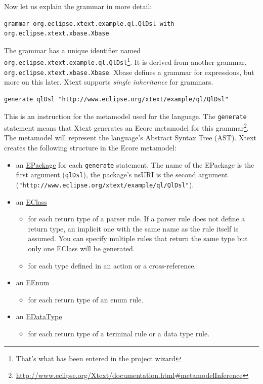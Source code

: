 Now let us explain the grammar in more detail:

\begin{lstlisting}[language=Xtext]
grammar org.eclipse.xtext.example.ql.QlDsl with org.eclipse.xtext.xbase.Xbase
\end{lstlisting}

The grammar has a unique identifier named
\texttt{org.eclipse.xtext.example.ql.QlDsl}\footnote{That's what has been
entered in the project wizard}. It is derived from another grammar,
\texttt{org.eclipse.xtext.xbase.Xbase}. Xbase defines a grammar for expressions,
but more on this later. Xtext supports \emph{single inheritance} for grammars.

\begin{lstlisting}[language=Xtext]
generate qlDsl "http://www.eclipse.org/xtext/example/ql/QlDsl"
\end{lstlisting}

This is an instruction for the metamodel used for the language. The
\texttt{generate} statement means that Xtext generates an Ecore metamodel for
this
grammar\footnote{\url{http://www.eclipse.org/Xtext/documentation.html\#metamodelInference}}.
The metamodel will represent the language's Abstract Syntax Tree
(AST). Xtext creates the following structure in the Ecore metamodel:
\begin{itemize}
  \item an
  \href{http://download.eclipse.org/modeling/emf/emf/javadoc/2.7.0/org/eclipse/emf/ecore/EPackage.html}{EPackage}
  for each \texttt{generate} statement. The name of the EPackage is the first
  argument (\texttt{qlDsl}), the package's nsURI is the second argument
  \newline(\texttt{"http://www.eclipse.org/xtext/example/ql/QlDsl"}).
  \item an
  \href{http://download.eclipse.org/modeling/emf/emf/javadoc/2.7.0/org/eclipse/emf/ecore/EClass.html}{EClass}
	\begin{itemize}
		\item for each return type of a parser rule. 
		If a parser rule does not define a return type, an implicit one with the same name as the rule itself is assumed. You can specify multiple rules that return the same type but only one EClass will be generated.
		\item for each type defined in an action or a cross-reference.
	\end{itemize}
  \item an
  \href{http://download.eclipse.org/modeling/emf/emf/javadoc/2.7.0/org/eclipse/emf/ecore/EEnum.html}{EEnum}
	\begin{itemize}
		\item for each return type of an enum rule. 
	\end{itemize}
  \item an
  \href{http://download.eclipse.org/modeling/emf/emf/javadoc/2.7.0/org/eclipse/emf/ecore/EDataType.html}{EDataType}
	\begin{itemize}
		\item for each return type of a terminal rule or a data type rule. 
	\end{itemize}
\end{itemize}

